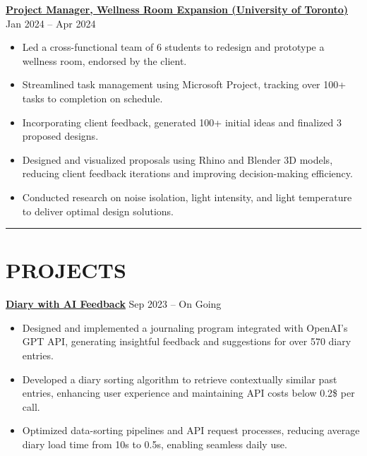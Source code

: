\documentclass[a4paper,10pt]{article}
\begin{document}
\vspace{0.3cm}
\noindent\href{https://github.com/Ken-2511/wellness-room-expansion}{\uline{
\textbf{Project Manager, Wellness Room Expansion (University of Toronto)}}} \hfill Jan 2024 -- Apr 2024
\begin{itemize}[leftmargin=0.2in]
    \item Led a cross-functional team of 6 students to redesign and prototype a wellness room, endorsed by the client.
    \item Streamlined task management using Microsoft Project, tracking over 100+ tasks to completion on schedule.
    \item Incorporating client feedback, generated 100+ initial ideas and finalized 3 proposed designs.
    \item Designed and visualized proposals using Rhino and Blender 3D models, reducing client feedback iterations and improving decision-making efficiency.
    \item Conducted research on noise isolation, light intensity, and light temperature to deliver optimal design solutions.
\end{itemize}

\noindent\rule{\linewidth}{1pt}

\section*{\textbf{PROJECTS}}

\noindent\href{https://github.com/Ken-2511/Diary-with-ChatGPT-Comment}{\uline{
\textbf{Diary with AI Feedback}}} \hfill Sep 2023 -- On Going
\begin{itemize}[leftmargin=0.2in]
    \item Designed and implemented a journaling program integrated with OpenAI’s GPT API, generating insightful feedback and suggestions for over 570 diary entries.
    \item Developed a diary sorting algorithm to retrieve contextually similar past entries, enhancing user experience and maintaining API costs below 0.2\$ per call.
    \item Optimized data-sorting pipelines and API request processes, reducing average diary load time from 10s to 0.5s, enabling seamless daily use.
\end{itemize}
\end{document}

